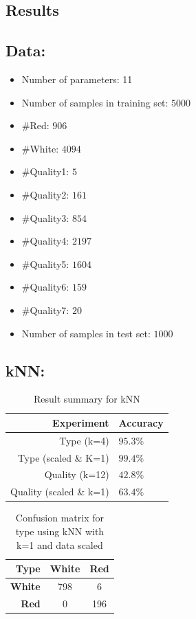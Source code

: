 \documentclass[twoside]{article}
\begin{document}
\begin{multicols}{2}
\section{Results}
\subsection*{\textbf{Data:}}
\begin{itemize}
  \item Number of parameters: 11
  \item Number of samples in training set: $5000$
  \item \#Red: $906$
  \item \#White: $4094$
  \item \#Quality1: $5$
  \item \#Quality2: $161$
  \item \#Quality3: $854$
  \item \#Quality4: $2197$
  \item \#Quality5: $1604$
  \item \#Quality6: $159$
  \item \#Quality7: $20$
  \item Number of samples in test set: $1000$
\end{itemize}

\subsection*{\textbf{kNN:}}
\begin{table}[H]
\caption{Result summary for kNN}
\centering
\begin{tabular}{r|l}
\textbf{Experiment} & \textbf{Accuracy}\\
\midrule
Type (k=4)  & $95.3\%$\\
Type (scaled \& K=1) & $99.4\%$\\
\hline
Quality (k=12) & $42.8\%$\\
Quality (scaled \& k=1) & $63.4\%$\\
\end{tabular}
\end{table}

\begin{table}[H]
\caption{Confusion matrix for type using kNN with k=1 and data scaled}
\label{ConfusionKNNscaled}
\centering
\begin{tabular}{r||c|c}
\textbf{Type} & \textbf{White} & \textbf{Red} \\
\hline \hline
\textbf{White} & 798  & 6\\
\hline
\textbf{Red} & 0 & 196\\
\end{tabular}
\end{table}


\end{multicols}
\end{document}

